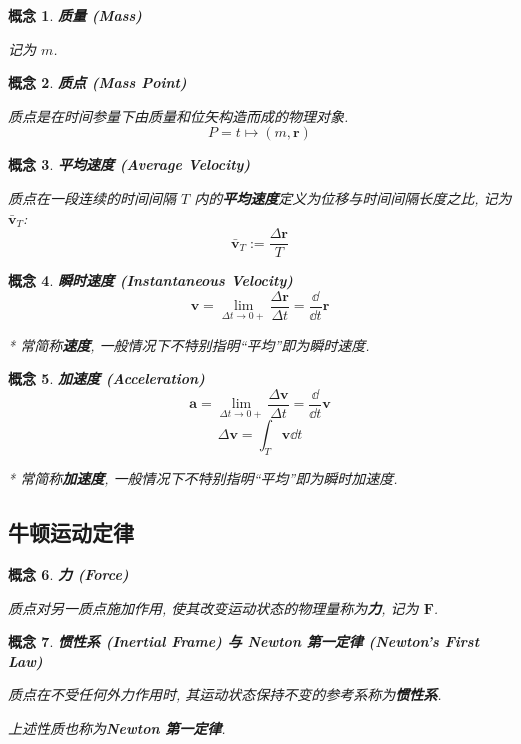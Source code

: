 \documentclass[UTF8]{ctexart}
\newcommand{\<}{\langle}
\renewcommand{\>}{\rangle}                              %
\newenvironment{dfn_box}{
    \begin{tcolorbox}[enhanced, colback=dfn_green2, boxrule=0pt, frame hidden,
        borderline west={0.7mm}{0.1mm}{dfn_green1},breakable]
    }
    {\end{tcolorbox}}
\theoremstyle{MyStyle} %
\newtheorem{definition}{概念}[subsection]
\newenvironment{cpt}{\begin{dfn_box}\begin{definition}}{\end{definition}\end{dfn_box}}
\begin{document}
        \begin{cpt}
            \textbf{质量 (Mass)}

            记为 \(m\). 
        \end{cpt}
        
        \begin{cpt}
            \textbf{质点 (Mass Point)}

            质点是在时间参量下由质量和位矢构造而成的物理对象. 
            \[P=t\mapsto(m,\bm{r})\]
        \end{cpt}
        
        \begin{cpt}
            \textbf{平均速度 (Average Velocity)}

            质点在一段连续的时间间隔 \(T\) 内的\textbf{平均速度}定义为位移与时间间隔长度之比, 记为 \(\bar{\bm{v}}_T\): 
            \[\bar{\bm{v}}_T:=\frac{\Delta\bm{r}}{T}\]
        \end{cpt}
        
        \begin{cpt}
            \textbf{瞬时速度 (Instantaneous Velocity)}
            \[\bm{v}=\lim_{\Delta t\to 0+}\frac{\Delta\bm{r}}{\Delta t}=\frac{\dd}{\dd t}\bm{r}\]

            * \textit{常简称\textbf{速度}, 一般情况下不特别指明``平均''即为瞬时速度. }
        \end{cpt}
        
        \begin{cpt}
            \textbf{加速度 (Acceleration)}
            \[\bm{a}=\lim_{\Delta t\to 0+}\frac{\Delta\bm{v}}{\Delta t}=\frac{\dd}{\dd t}\bm{v}\]
            \[\Delta\bm{v}=\int_T \bm{v}\dd t\]

            * \textit{常简称\textbf{加速度}, 一般情况下不特别指明``平均''即为瞬时加速度. }
        \end{cpt}

    \subsection{牛顿运动定律}
        
        \begin{cpt}
            \textbf{力 (Force)}

            质点对另一质点施加作用, 使其改变运动状态的物理量称为\textbf{力}, 记为 \(\bm{F}\). 
        \end{cpt}
        
        \begin{cpt}
            \textbf{惯性系 (Inertial Frame) 与 Newton 第一定律 (Newton's First Law)}

            质点在不受任何外力作用时, 其运动状态保持不变的参考系称为\textbf{惯性系}. 

            上述性质也称为\textbf{Newton 第一定律}. 
        \end{cpt}
        
\end{document}
